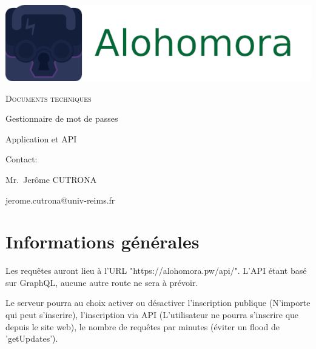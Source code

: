 \documentclass[oneside]{report}
\author{Sylvain COMBRAQUE, Sarah LAMOTTE, Nathan JANCZEWSKI, Léo BERGEROT}
\begin{document}
	\begin{titlepage}
		\centering
		\includegraphics[scale=.5]{logo_large}
		\vspace{5cm}
		{\par\scshape\Huge Documents techniques\par}
		\vspace{5cm}
		{\par Gestionnaire de mot de passes\par}
		{\par Application et API\par}
		\vfill
		\par Contact:
		{\par\small Mr.\ Jerôme CUTRONA \par}
		\par jerome.cutrona@univ-reims.fr\
	\end{titlepage}

	\pagestyle{fancy}
	\fancyhf{}
	\tableofcontents

	\chapter{Informations générales}
	\vspace{2cm}
	\par Les requêtes auront lieu à l'URL "https://alohomora.pw/api/". L'API étant basé sur GraphQL, aucune autre route ne sera à prévoir.\\
	\par Le serveur pourra au choix activer ou désactiver l'inscription publique (N'importe qui peut s'inscrire), l'inscription via API (L'utilisateur ne pourra s'inscrire que depuis le site web), le nombre de requêtes par minutes (éviter un flood de 'getUpdates').\\
\end{document}
